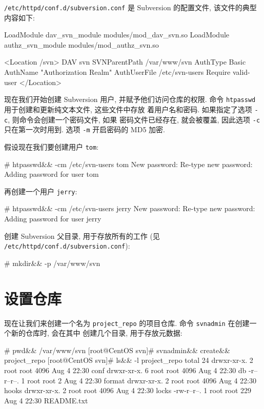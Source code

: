 \documentclass[nofonts, oneside]{ctexbook}
\newcommand\shellcmd[1]{\texttt{#1}}
\begin{document}
\texttt{/etc/httpd/conf.d/subversion.conf} 是 Subversion
的配置文件, 该文件的典型内容如下:
\begin{svnshell}
LoadModule dav_svn_module   modules/mod_dav_svn.so
LoadModule authz_svn_module modules/mod_authz_svn.so

<Location /svn>
    DAV svn
    SVNParentPath /var/www/svn
    AuthType Basic
    AuthName "Authorization Realm"
    AuthUserFile /etc/svn-users
    Require valid-user
</Location>
\end{svnshell}

现在我们开始创建 Subversion 用户, 并赋予他们访问仓库的权限. 命令
\shellcmd{htpasswd} 用于创建和更新纯文本文件, 这些文件中存放
着用户名和密码. 如果指定了选项 \shellcmd{-c}, 则命令会创建一个密码文件, 如果
密码文件已经存在, 就会被覆盖, 因此选项 \shellcmd{-c} 只在第一次时用到. 选项
\shellcmd{-m} 开启密码的 MD5 加密.

假设现在我们要创建用户 \texttt{tom}:
\begin{svnshell}
# htpasswd&\index{\shellcmd{htpasswd}}& -cm /etc/svn-users tom
New password:
Re-type new password:
Adding password for user tom
\end{svnshell}

再创建一个用户 \texttt{jerry}:
\begin{svnshell}
# htpasswd&\index{\shellcmd{htpasswd}}& -cm /etc/svn-users jerry
New password:
Re-type new password:
Adding password for user jerry
\end{svnshell}

创建 Subversion 父目录, 用于存放所有的工作  (见
\texttt{/etc/httpd/conf.d/subversion.conf}):
\begin{svnshell}
# mkdir&\index{\shellcmd{mkdir}}& -p /var/www/svn
\end{svnshell}

\section{设置仓库}
\label{sec:repository_setup}
现在让我们来创建一个名为 \texttt{project\_repo} 的项目仓库. 命令
\shellcmd{svnadmin} 在创建一个新的仓库时, 会在其中
创建几个目录, 用于存放元数据:
\begin{svnshell}
# pwd&&
/var/www/svn
[root@CentOS svn]# svnadmin&& create&& project_repo
[root@CentOS svn]# ls&& -l project_repo
total 24
drwxr-xr-x. 2 root root 4096 Aug  4 22:30 conf
drwxr-xr-x. 6 root root 4096 Aug  4 22:30 db
-r--r--r--. 1 root root    2 Aug  4 22:30 format
drwxr-xr-x. 2 root root 4096 Aug  4 22:30 hooks
drwxr-xr-x. 2 root root 4096 Aug  4 22:30 locks
-rw-r--r--. 1 root root  229 Aug  4 22:30 README.txt
\end{svnshell}

\printindex
\end{document}
